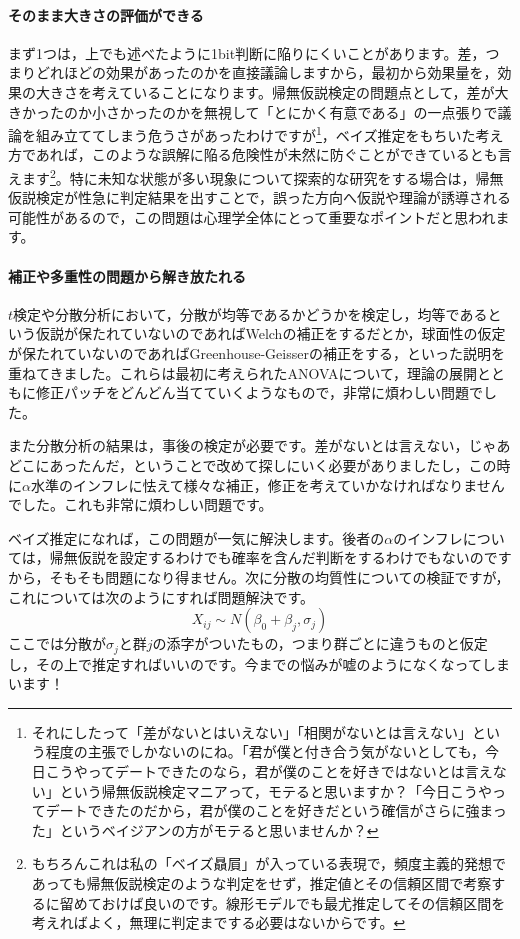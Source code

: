\documentclass{ltjsarticle}
\begin{document}
\paragraph{そのまま大きさの評価ができる}
まず1つは，上でも述べたように1bit判断に陥りにくいことがあります。差，つまりどれほどの効果があったのかを直接議論しますから，最初から効果量を，効果の大きさを考えていることになります。帰無仮説検定の問題点として，差が大きかったのか小さかったのかを無視して「とにかく有意である」の一点張りで議論を組み立ててしまう危うさがあったわけですが\footnote{それにしたって「差がないとはいえない」「相関がないとは言えない」という程度の主張でしかないのにね。「君が僕と付き合う気がないとしても，今日こうやってデートできたのなら，君が僕のことを好きではないとは言えない」という帰無仮説検定マニアって，モテると思いますか？「今日こうやってデートできたのだから，君が僕のことを好きだという確信がさらに強まった」というベイジアンの方がモテると思いませんか？}，ベイズ推定をもちいた考え方であれば，このような誤解に陥る危険性が未然に防ぐことができているとも言えます\footnote{もちろんこれは私の「ベイズ贔屓」が入っている表現で，頻度主義的発想であっても帰無仮説検定のような判定をせず，推定値とその信頼区間で考察するに留めておけば良いのです。線形モデルでも最尤推定してその信頼区間を考えればよく，無理に判定までする必要はないからです。}。特に未知な状態が多い現象について探索的な研究をする場合は，帰無仮説検定が性急に判定結果を出すことで，誤った方向へ仮説や理論が誘導される可能性があるので，この問題は心理学全体にとって重要なポイントだと思われます。
\paragraph{補正や多重性の問題から解き放たれる}
$t$検定や分散分析において，分散が均等であるかどうかを検定し，均等であるという仮説が保たれていないのであればWelchの補正をするだとか，球面性の仮定が保たれていないのであればGreenhouse-Geisserの補正をする，といった説明を重ねてきました。これらは最初に考えられたANOVAについて，理論の展開とともに修正パッチをどんどん当てていくようなもので，非常に煩わしい問題でした。

また分散分析の結果は，事後の検定が必要です。差がないとは言えない，じゃあどこにあったんだ，ということで改めて探しにいく必要がありましたし，この時に$\alpha$水準のインフレに怯えて様々な補正，修正を考えていかなければなりませんでした。これも非常に煩わしい問題です。

ベイズ推定になれば，この問題が一気に解決します。後者の$\alpha$のインフレについては，帰無仮説を設定するわけでも確率を含んだ判断をするわけでもないのですから，そもそも問題になり得ません。次に分散の均質性についての検証ですが，これについては次のようにすれば問題解決です。
\[ X_{ij} \sim N(\beta_0 + \beta_j, \sigma_j)\]
ここでは分散が$\sigma_j$と群$j$の添字がついたもの，つまり群ごとに違うものと仮定し，その上で推定すればいいのです。今までの悩みが嘘のようになくなってしまいます！
\end{document}
